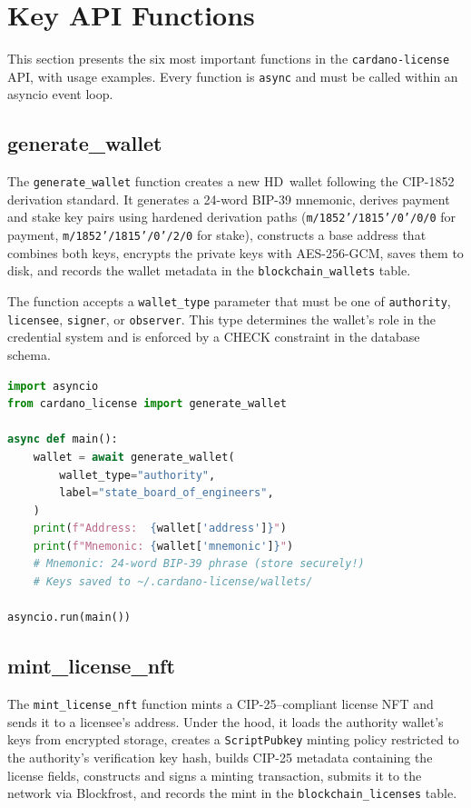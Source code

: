 \section{Key API Functions}
\label{sec:api-functions}

This section presents the six most important functions in the
\texttt{cardano-license} API, with usage examples.  Every function is
\texttt{async} and must be called within an asyncio event loop.

\subsection{generate\_wallet}

The \texttt{generate\_wallet} function creates a new HD~wallet following the
CIP-1852 derivation standard.  It generates a 24-word BIP-39 mnemonic,
derives payment and stake key pairs using hardened derivation paths
(\texttt{m/1852'/1815'/0'/0/0} for payment, \texttt{m/1852'/1815'/0'/2/0}
for stake), constructs a base address that combines both keys, encrypts the
private keys with AES-256-GCM, saves them to disk, and records the wallet
metadata in the \texttt{blockchain\_wallets} table.

The function accepts a \texttt{wallet\_type} parameter that must be one of
\texttt{authority}, \texttt{licensee}, \texttt{signer}, or
\texttt{observer}.  This type determines the wallet's role in the credential
system and is enforced by a CHECK constraint in the database schema.

\begin{lstlisting}[language=Python,
  caption={Generating an authority wallet.}]
import asyncio
from cardano_license import generate_wallet

async def main():
    wallet = await generate_wallet(
        wallet_type="authority",
        label="state_board_of_engineers",
    )
    print(f"Address:  {wallet['address']}")
    print(f"Mnemonic: {wallet['mnemonic']}")
    # Mnemonic: 24-word BIP-39 phrase (store securely!)
    # Keys saved to ~/.cardano-license/wallets/

asyncio.run(main())
\end{lstlisting}

\subsection{mint\_license\_nft}

The \texttt{mint\_license\_nft} function mints a CIP-25--compliant license
NFT and sends it to a licensee's address.  Under the hood, it loads the
authority wallet's keys from encrypted storage, creates a
\texttt{ScriptPubkey} minting policy restricted to the authority's
verification key hash, builds CIP-25 metadata containing the license
fields, constructs and signs a minting transaction, submits it to the
network via Blockfrost, and records the mint in the
\texttt{blockchain\_licenses} table.

